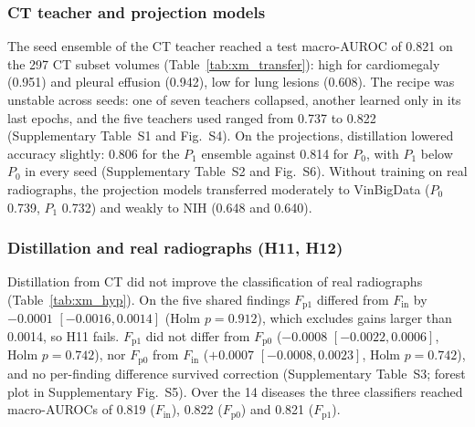 \subsubsection{CT teacher and projection models}
The seed ensemble of the CT teacher reached a test macro-AUROC of 0.821 on the 297 CT subset volumes (Table~\ref{tab:xm_transfer}): high
for cardiomegaly (0.951) and pleural effusion (0.942), low for lung lesions (0.608). The recipe was unstable across seeds: one of seven
teachers collapsed, another learned only in its last epochs, and the five teachers used ranged from 0.737 to 0.822 (Supplementary Table~S1
and Fig.~S4). On the projections, distillation lowered accuracy slightly: 0.806 for the $P_1$ ensemble against 0.814 for $P_0$, with $P_1$
below $P_0$ in every seed (Supplementary Table~S2 and Fig.~S6). Without training on real radiographs, the projection models transferred
moderately to VinBigData ($P_0$ 0.739, $P_1$ 0.732) and weakly to NIH (0.648 and 0.640).

\begin{table}[!t]
\centering
\caption{CT teacher, projection models and zero-shot transfer: test AUROC of the seed ensembles for the six findings and their mean
(descriptive). NIH lung opacity is the approximate mapping to Infiltration.}
\label{tab:xm_transfer}
\end{table}

\subsubsection{Distillation and real radiographs (H11, H12)}
Distillation from CT did not improve the classification of real radiographs (Table~\ref{tab:xm_hyp}). On the five shared findings
$F_{\mathrm{p1}}$ differed from $F_{\mathrm{in}}$ by $-0.0001$ $[-0.0016, 0.0014]$ (Holm $p=0.912$), which excludes gains larger than
0.0014, so H11 fails. $F_{\mathrm{p1}}$ did not differ from $F_{\mathrm{p0}}$ ($-0.0008$ $[-0.0022, 0.0006]$, Holm $p=0.742$), nor
$F_{\mathrm{p0}}$ from $F_{\mathrm{in}}$ ($+0.0007$ $[-0.0008, 0.0023]$, Holm $p=0.742$), and no per-finding difference survived correction
(Supplementary Table~S3; forest plot in Supplementary Fig.~S5). Over the 14 diseases the three classifiers reached macro-AUROCs of 0.819
($F_{\mathrm{in}}$), 0.822 ($F_{\mathrm{p0}}$) and 0.821 ($F_{\mathrm{p1}}$).

\begin{table}[!t]
\centering
\caption{Study~III hypotheses: differences of the seed ensembles with 95\,\% bootstrap intervals (\num{10000} resamples). Holm: H11 with the
two H12 contrasts. The $P_0$ row of H14 is descriptive.}
\label{tab:xm_hyp}
\end{table}

